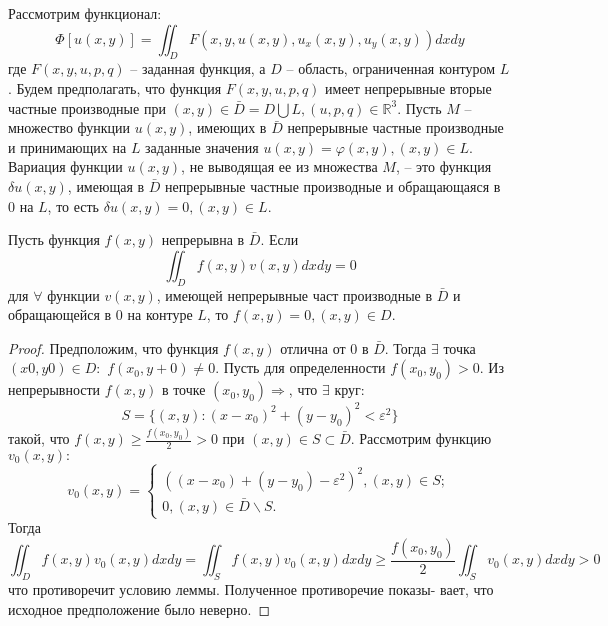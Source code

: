 Рассмотрим функционал:
\begin{equation}
    \Phi[u(x, y)]=\iint_D F(x, y, u(x, y), u_x(x, y), u_y(x, y))dxdy
    \label{func2}
\end{equation}
где $F(x, y, u, p, q)$ – заданная функция, а $D$ – область, ограниченная контуром $L$. Будем предполагать, что функция $F(x, y, u, p, q)$ имеет непрерывные вторые частные производные при $(x, y) \in \bar D = D \bigcup L, (u, p, q) \in \mathbb{R}^3$. Пусть $M$ – множество функции $u(x, y)$, имеющих в $\bar D$ непрерывные частные производные и принимающих на $L$ заданные значения $u(x, y) = \varphi(x, y),(x, y) \in L$. Вариация функции $u(x, y)$, не выводящая ее из множества $M$, – это функция $\delta u(x, y)$, имеющая в $\bar D$ непрерывные частные производные и обращающаяся в 0 на $L$, то есть $\delta u(x, y) = 0,(x, y) \in L$.

\begin{lemma}
    Пусть функция $f(x, y)$ непрерывна в $\bar D$. Если
    $$\iint_D f(x,y)v(x,y)dxdy=0$$
    для $\forall$ функции $v(x, y)$, имеющей непрерывные част производные в $\bar D$ и обращающейся в 0 на контуре $L$, то $f(x, y) = 0, (x, y) \in D$.
\end{lemma}
\begin{proof}
    Предположим, что функция $f(x, y)$ отлична от 0
    в $\bar D$. Тогда $\exists$ точка $(x0, y0) \in D:$ $f(x_0, y+0)\neq0$. Пусть
    для определенности $f(x_0, y_0) > 0$. Из непрерывности $f(x, y)$ в точке $(x_0, y_0)\Longrightarrow$, что $\exists$ круг: $$S = \{(x, y) : (x-x_0)^2 + (y-y_0)^2 < \varepsilon^2\}$$
    такой, что $f(x,y) \geq \frac{f(x_0,y_0)}{2}>0$ при $(x,y)\in S \subset \bar D$. Рассмотрим функцию $v_0(x,y):$
    $$v_0(x,y)=\begin{cases}
        ((x-x_0) + (y-y_0)-\varepsilon^2)^2,  (x, y) \in S;\\
        0, (x,y)\in \bar D\backslash S.
    \end{cases}$$
    Тогда $$\iint_D f(x,y)v_0(x,y)dxdy=\iint_S f(x,y)v_0(x,y)dxdy \geq \frac{f(x_0,y_0)}{2}\iint_S v_0(x,y)dxdy>0$$
    что противоречит условию леммы. Полученное противоречие показы-
    вает, что исходное предположение было неверно.
\end{proof}

